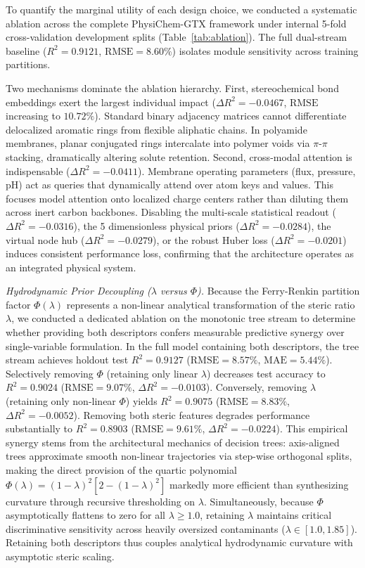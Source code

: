 \documentclass[11pt]{article}
\newcommand{\rsq}{R^{2}}
\begin{document}
To quantify the marginal utility of each design choice, we conducted a systematic ablation across the complete PhysiChem-GTX framework under internal 5-fold cross-validation development splits (Table~\ref{tab:ablation}). The full dual-stream baseline ($\rsq = 0.9121$, $\mathrm{RMSE} = 8.60\%$) isolates module sensitivity across training partitions.

Two mechanisms dominate the ablation hierarchy. First, stereochemical bond embeddings exert the largest individual impact ($\Delta \rsq = -0.0467$, $\mathrm{RMSE}$ increasing to $10.72\%$). Standard binary adjacency matrices cannot differentiate delocalized aromatic rings from flexible aliphatic chains. In polyamide membranes, planar conjugated rings intercalate into polymer voids via $\pi$-$\pi$ stacking, dramatically altering solute retention. Second, cross-modal attention is indispensable ($\Delta \rsq = -0.0411$). Membrane operating parameters (flux, pressure, pH) act as queries that dynamically attend over atom keys and values. This focuses model attention onto localized charge centers rather than diluting them across inert carbon backbones. Disabling the multi-scale statistical readout ($\Delta \rsq = -0.0316$), the 5 dimensionless physical priors ($\Delta \rsq = -0.0284$), the virtual node hub ($\Delta \rsq = -0.0279$), or the robust Huber loss ($\Delta \rsq = -0.0201$) induces consistent performance loss, confirming that the architecture operates as an integrated physical system.

\textit{Hydrodynamic Prior Decoupling ($\lambda$ versus $\Phi$).} Because the Ferry-Renkin partition factor $\Phi(\lambda)$ represents a non-linear analytical transformation of the steric ratio $\lambda$, we conducted a dedicated ablation on the monotonic tree stream to determine whether providing both descriptors confers measurable predictive synergy over single-variable formulation. In the full model containing both descriptors, the tree stream achieves holdout test $\rsq = 0.9127$ ($\mathrm{RMSE} = 8.57\%$, $\mathrm{MAE} = 5.44\%$). Selectively removing $\Phi$ (retaining only linear $\lambda$) decreases test accuracy to $\rsq = 0.9024$ ($\mathrm{RMSE} = 9.07\%$, $\Delta \rsq = -0.0103$). Conversely, removing $\lambda$ (retaining only non-linear $\Phi$) yields $\rsq = 0.9075$ ($\mathrm{RMSE} = 8.83\%$, $\Delta \rsq = -0.0052$). Removing both steric features degrades performance substantially to $\rsq = 0.8903$ ($\mathrm{RMSE} = 9.61\%$, $\Delta \rsq = -0.0224$). This empirical synergy stems from the architectural mechanics of decision trees: axis-aligned trees approximate smooth non-linear trajectories via step-wise orthogonal splits, making the direct provision of the quartic polynomial $\Phi(\lambda) = (1-\lambda)^2[2-(1-\lambda)^2]$ markedly more efficient than synthesizing curvature through recursive thresholding on $\lambda$. Simultaneously, because $\Phi$ asymptotically flattens to zero for all $\lambda \geq 1.0$, retaining $\lambda$ maintains critical discriminative sensitivity across heavily oversized contaminants ($\lambda \in [1.0, 1.85]$). Retaining both descriptors thus couples analytical hydrodynamic curvature with asymptotic steric scaling.
\end{document}
